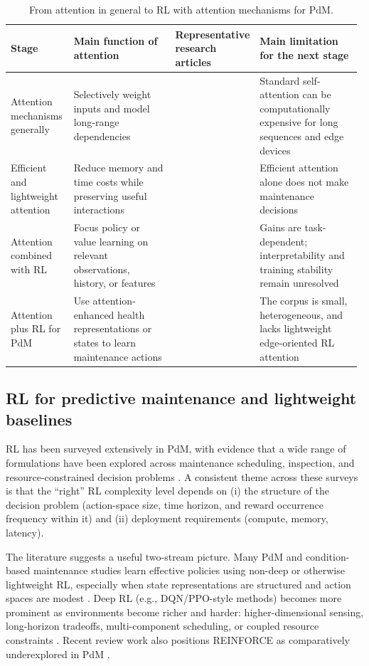 \documentclass[sn-basic]{sn-jnl}%
\begin{document}
\begin{table}[h]
\centering
\caption{From attention in general to RL with attention mechanisms for PdM.}
\label{tab:attention_funnel_synthesis}
	\begin{tabular}{L{0.18\linewidth} L{0.30\linewidth} L{0.20\linewidth} L{0.30\linewidth}}
	\toprule
	\textbf{Stage} & \textbf{Main function of attention} & \textbf{Representative research articles} & \textbf{Main limitation for the next stage}\\
	\midrule
	Attention mechanisms generally & Selectively weight inputs and model long-range dependencies & \cite{Bahdanau2014,Vaswani2017,Luong2015} & Standard self-attention can be computationally expensive for long sequences and edge devices\\
	Efficient and lightweight attention & Reduce memory and time costs while preserving useful interactions & \cite{Choromanski2020, Siraskar2024,Wang2020Linformer} & Efficient attention alone does not make maintenance decisions\\
	Attention combined with RL & Focus policy or value learning on relevant observations, history, or features & \cite{BlakemanMareschal2022,Mott2019,Sorokin2015,Wu2021} & Gains are task-dependent; interpretability and training stability remain unresolved\\
	Attention plus RL for PdM & Use attention-enhanced health representations or states to learn maintenance actions & \cite{Guo2026,Luong2015, Zhao2024} & The corpus is small, heterogeneous, and lacks lightweight edge-oriented RL attention\\
	\bottomrule
	\end{tabular}
\end{table}

\subsection{RL for predictive maintenance and lightweight baselines}
RL has been surveyed extensively in PdM, with evidence that a wide range of formulations have been explored across maintenance scheduling, inspection, and resource-constrained decision problems \cite{Siraskar2023, Ogunfowora2023, Zhang2024}. A consistent theme across these surveys is that the ``right'' RL complexity level depends on (i) the structure of the decision problem (action-space size, time horizon, and reward occurrence frequency within it) and (ii) deployment requirements (compute, memory, latency).

The literature suggests a useful two-stream picture. Many PdM and condition-based maintenance studies learn effective policies using non-deep or otherwise lightweight RL, especially when state representations are structured and action spaces are modest \cite{Adsule2020, Yousefi2020, Rasay2024, Dadash2024}. Deep RL (e.g., DQN/PPO-style methods) becomes more prominent as environments become richer and harder: higher-dimensional sensing, long-horizon tradeoffs, multi-component scheduling, or coupled resource constraints \cite{Liu2020, Chen2023, Lee2022, Ong2022-02}. Recent review work also positions \textsc{REINFORCE} as comparatively underexplored in PdM \cite{Siraskar2025}.
\end{document}
